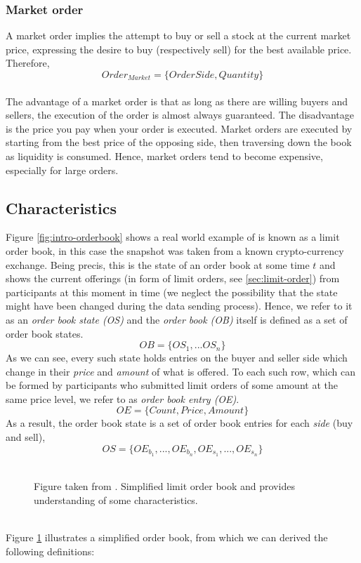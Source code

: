 \subsubsection{Market order}
\label{sec:market-order}

A market order implies the attempt to buy or sell a stock at the current market price, expressing the desire to buy (respectively sell) for the best available price. Therefore,
\[Order_{Market}=\{OrderSide, Quantity\}\]
\\
The advantage of a market order is that as long as there are willing buyers and sellers, the execution of the order is almost always guaranteed. \cite{sec-market-order}
The disadvantage is the price you pay when your order is executed.
Market orders are executed by starting from the best price of the opposing side, then traversing down the book as liquidity is consumed. 
Hence, market orders tend to become expensive, especially for large orders.


\subsection{Characteristics}

Figure \ref{fig:intro-orderbook} shows a real world example of is known as a limit order book, in this case the snapshot was taken from a known crypto-currency exchange.
Being precis, this is the state of an order book at some time $t$ and shows the current offerings (in form of limit orders, see \ref{sec:limit-order}) from participants at this moment in time (we neglect the possibility that the state might have been changed during the data sending process). 
Hence, we refer to it as an \textit{order book state (OS)} and the \textit{order book (OB)} itself is defined as a set of order book states.
\[
OB=\{OS_1, ... OS_n\}
\]
As we can see, every such state holds entries on the buyer and seller side which change in their \textit{price} and \textit{amount} of what is offered.
To each such row, which can be formed by participants who submitted limit orders of some amount at the same price level, we refer to as \textit{order book entry (OE)}.
\[
OE=\{Count, Price, Amount\}
\]
As a result, the order book state is a set of order book entries for each \textit{side} (buy and sell),
\[
OS=\{OE_{b_1}, ..., OE_{b_n}, OE_{s_1}, ..., OE_{s_n}\}
\]
\\
\begin{figure}[H]
    \centering
    \caption{Figure taken from \cite{miranda}. Simplified limit order book and provides understanding of some characteristics.}
    \label{fig:orderbook-simple}
\end{figure}
\hfill
\\
Figure \ref{fig:orderbook-simple} illustrates a simplified order book, from which we can derived the following definitions:

